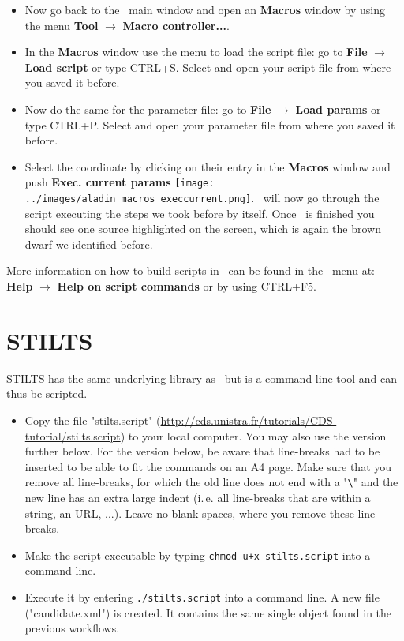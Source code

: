 \documentclass [a4paper, 12pt]{article}
\begin{document}
\begin{itemize}
\item Now go back to the \aladin\ main window and open an \textbf{Macros}
window by using the menu \textbf{Tool} $\rightarrow$ \textbf{Macro
controller...}.
\item In the \textbf{Macros} window use the menu to load the script file: go to
\textbf{File} $\rightarrow$ \textbf{Load script} or type CTRL+S. Select and
open your script file from where you saved it before.
\item Now do the same for the parameter file: go to
\textbf{File} $\rightarrow$ \textbf{Load params} or type CTRL+P. Select and
open your parameter file from where you saved it before.
\item Select the coordinate by clicking on their entry in the \textbf{Macros}
window and push \textbf{Exec. current params}
\texttt{[image: ../images/aladin\_macros\_execcurrent.png]}. \aladin\ will now go
through the script executing the steps we took before by itself. Once \aladin\
is finished you should see one source highlighted on the screen, which is again
the brown dwarf we identified before.
\end{itemize}
More information on how to build scripts in \aladin\ can be found in the
\aladin\ menu at: \textbf{Help} $\rightarrow$ \textbf{Help on script commands}
or by using CTRL+F5.

\section{STILTS}
STILTS has the same underlying library as \topcat\ but is a command-line tool
and can thus be scripted.
\begin{itemize}
    \item Copy the file "stilts.script"
    (\url{http://cds.unistra.fr/tutorials/CDS-tutorial/stilts.script}) to your
    local computer. You may also use the version further below. For the version
    below, be aware that line-breaks had to be inserted to be able to fit the
    commands on an A4 page. Make sure that you remove all line-breaks, for
    which the old line does not end with a "\verb|\|" and the new line has an
    extra large indent (i.\,e. all line-breaks that are within a string, an
    URL, ...).
    Leave no blank spaces, where you remove these line-breaks.
    \item Make the script executable by typing \texttt{chmod u+x stilts.script}
    into a command line.
    \item Execute it by entering \texttt{./stilts.script} into a command
    line. A new file ("candidate.xml") is created. It contains the same single
    object found in the previous workflows.
\end{itemize}
\end{document}
